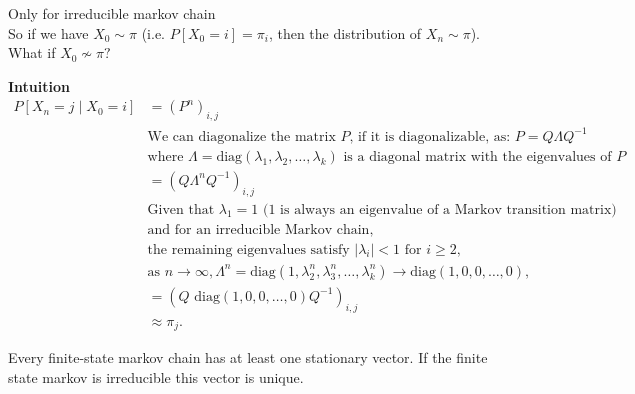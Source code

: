 \documentclass[a4paper]{article}
\begin{document}
\begin{note}{Only for irreducible markov chain}\\
  So if we have $X_0 \sim \pi$ (i.e.  $P[X_0=i] = \pi_i$, then the distribution of $X_n \sim \pi$). What if $X_0 \not\sim \pi?$
\end{note}

\noindent\hrulefill

\textbf{Intuition}
\begin{align*}
  P[X_n = j \mid  X_0 = i] &= (P^n)_{i,j} \\
                           &\text{We can diagonalize the matrix $P$, if it is diagonalizable, as: $P = Q \Lambda Q^{-1}$} \\
    &\text{where } \Lambda = \text{diag}(\lambda_1, \lambda_2, \ldots, \lambda_k) \text{ is a diagonal matrix with the eigenvalues of } P \\
    &= (Q \Lambda^n Q^{-1})_{i,j} \\
    & \text{Given that } \lambda_1 = 1 \text{ (1 is always an eigenvalue of a Markov transition matrix)} \\
    &\text{and for an irreducible Markov chain},\\
    &\text{the remaining eigenvalues satisfy } |\lambda_i| < 1 \text{ for } i \geq 2, \\
    &\text{as } n \to \infty, \Lambda^n = \text{diag}(1, \lambda_2^n, \lambda_3^n, \dots, \lambda_k^n) \to \text{diag}(1, 0, 0, \dots, 0), \\
    &= (Q \text{ diag}(1, 0, 0, \dots, 0) Q^{-1})_{i,j} \\
    &\approx \pi_j.
\end{align*}

\begin{theorem}
  Every finite-state markov chain has at least one stationary vector. If the finite state markov is irreducible this vector is unique.
\end{theorem}
\end{document}
